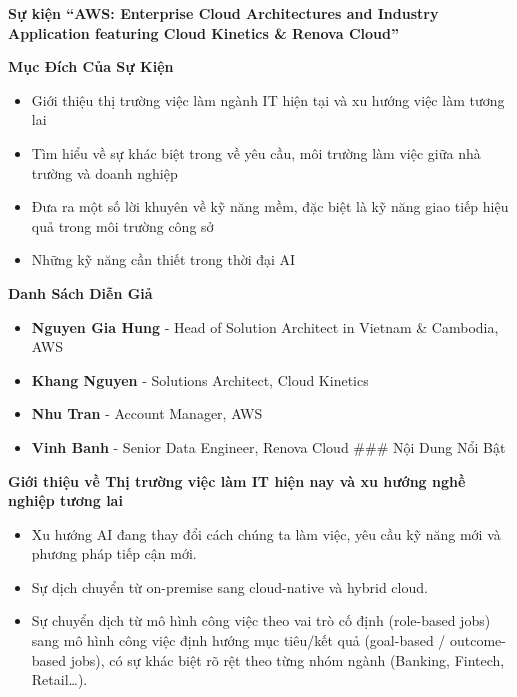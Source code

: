 \vspace{0.5em}\noindent\textbf{Sự kiện ``AWS: Enterprise Cloud Architectures and Industry
Application featuring Cloud Kinetics \& Renova
Cloud''}\par

\vspace{0.5em}\noindent\textbf{Mục Đích Của Sự
Kiện}\par

\begin{itemize}
\tightlist
\item
  Giới thiệu thị trường việc làm ngành IT hiện tại và xu hướng việc làm
  tương lai
\item
  Tìm hiểu về sự khác biệt trong về yêu cầu, môi trường làm việc giữa
  nhà trường và doanh nghiệp
\item
  Đưa ra một số lời khuyên về kỹ năng mềm, đặc biệt là kỹ năng giao tiếp
  hiệu quả trong môi trường công sở
\item
  Những kỹ năng cần thiết trong thời đại AI
\end{itemize}

\vspace{0.5em}\noindent\textbf{Danh Sách Diễn
Giả}\par

\begin{itemize}
\tightlist
\item
  \textbf{Nguyen Gia Hung} - Head of Solution Architect in Vietnam \&
  Cambodia, AWS
\item
  \textbf{Khang Nguyen} - Solutions Architect, Cloud Kinetics
\item
  \textbf{Nhu Tran} - Account Manager, AWS
\item
  \textbf{Vinh Banh} - Senior Data Engineer, Renova Cloud \#\#\# Nội
  Dung Nổi Bật
\end{itemize}

\vspace{0.5em}\noindent\textbf{Giới thiệu về Thị trường việc làm IT hiện nay và xu hướng
nghề nghiệp tương
lai}\par

\begin{itemize}
\tightlist
\item
  Xu hướng AI đang thay đổi cách chúng ta làm việc, yêu cầu kỹ năng mới
  và phương pháp tiếp cận mới.
\item
  Sự dịch chuyển từ on-premise sang cloud-native và hybrid cloud.
\item
  Sự chuyển dịch từ mô hình công việc theo vai trò cố định (role-based
  jobs) sang mô hình công việc định hướng mục tiêu/kết quả (goal-based /
  outcome-based jobs), có sự khác biệt rõ rệt theo từng nhóm ngành
  (Banking, Fintech, Retail\ldots).
\end{itemize}


